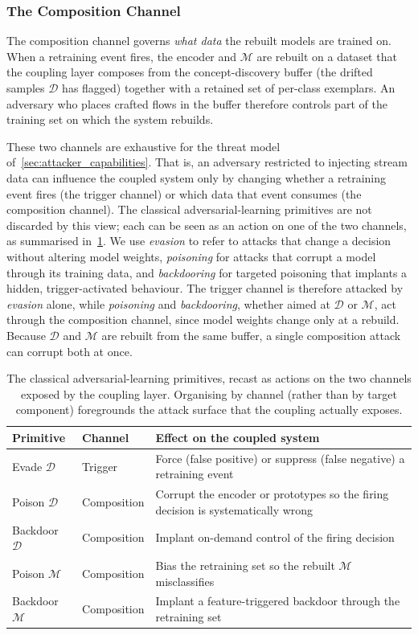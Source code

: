 \subsubsection{The Composition Channel}
The composition channel governs \emph{what data} the rebuilt models are trained on. When a retraining event fires, the encoder and $\mathcal{M}$ are rebuilt on a dataset that the coupling layer composes from the concept-discovery buffer (the drifted samples $\mathcal{D}$ has flagged) together with a retained set of per-class exemplars. An adversary who places crafted flows in the buffer therefore controls part of the training set on which the system rebuilds.

These two channels are exhaustive for the threat model of~\cref{sec:attacker_capabilities}. That is, an adversary restricted to injecting stream data can influence the coupled system only by changing whether a retraining event fires (the trigger channel) or which data that event consumes (the composition channel). The classical adversarial-learning primitives are not discarded by this view; each can be seen as an action on one of the two channels, as summarised in~\cref{tab:axt-primitive-channel}. We use \emph{evasion} to refer to attacks that change a decision without altering model weights, \emph{poisoning} for attacks that corrupt a model through its training data, and \emph{backdooring} for targeted poisoning that implants a hidden, trigger-activated behaviour. The trigger channel is therefore attacked by \emph{evasion} alone, while \emph{poisoning} and \emph{backdooring}, whether aimed at $\mathcal{D}$ or $\mathcal{M}$, act through the composition channel, since model weights change only at a rebuild. Because $\mathcal{D}$ and $\mathcal{M}$ are rebuilt from the same buffer, a single composition attack can corrupt both at once.

\begin{table}[H]
\centering
\small
\caption{The classical adversarial-learning primitives, recast as actions on the two channels exposed by the coupling layer. Organising by channel (rather than by target component) foregrounds the attack surface that the coupling actually exposes.}
\label{tab:axt-primitive-channel}
\begin{tabular}{@{}l l p{7.6cm}@{}}
\toprule
Primitive & Channel & Effect on the coupled system \\
\midrule
Evade $\mathcal{D}$        & Trigger      & Force (false positive) or suppress (false negative) a retraining event \\
Poison $\mathcal{D}$       & Composition  & Corrupt the encoder or prototypes so the firing decision is systematically wrong \\
Backdoor $\mathcal{D}$     & Composition  & Implant on-demand control of the firing decision \\
Poison $\mathcal{M}$       & Composition  & Bias the retraining set so the rebuilt $\mathcal{M}$ misclassifies \\
Backdoor $\mathcal{M}$     & Composition  & Implant a feature-triggered backdoor through the retraining set \\
\bottomrule
\end{tabular}
\end{table}

